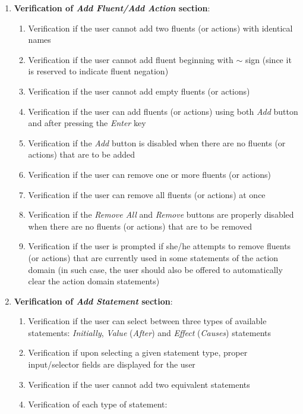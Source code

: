 \documentclass[a4paper]{article}
\begin{document}
\begin{enumerate}
    \item \textbf{Verification of \textit{Add Fluent/Add Action} section}:
    \begin{enumerate}
        \item Verification if the user cannot add two fluents (or actions) with identical names
        \item Verification if the user cannot add fluent beginning with $\sim$ sign (since it is reserved to indicate fluent negation)
        \item Verification if the user cannot add empty fluents (or actions)
        \item Verification if the user can add fluents (or actions) using both \textit{Add} button and after pressing the \textit{Enter} key
        \item Verification if the \textit{Add} button is disabled when there are no fluents (or actions) that are to be added
        \item Verification if the user can remove one or more fluents (or actions) 
        \item Verification if the user can remove all fluents (or actions) at once
        \item Verification if the \textit{Remove All} and \textit{Remove} buttons are properly disabled when there are no fluents (or actions) that are to be removed
        \item Verification if the user is prompted if she/he attempts to remove fluents (or actions) that are currently used in some statements of the action domain (in such case, the user should also be offered to automatically clear the action domain statements)
    \end{enumerate}
    \item \textbf{Verification of \textit{Add Statement} section}:
    \begin{enumerate}
        \item Verification if the user can select between three types of available statements: \textit{Initially}, \textit{Value} (\textit{After}) and \textit{Effect} (\textit{Causes}) statements
        \item Verification if upon selecting a given statement type, proper input/selector fields are displayed for the user
        \item Verification if the user cannot add two equivalent statements
        \item Verification of each type of statement:

\end{enumerate}
\end{enumerate}
\end{document}
